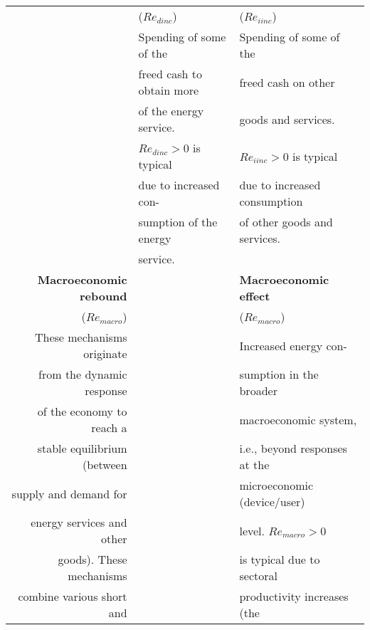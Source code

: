 \begin{table}
\begin{center}
\begin{tabular}{ r l l }
                                   & ($Re_{dinc}$)                                & ($Re_{iinc}$)   \\
                                   & Spending of some of the                      & Spending of some of the    \\
                                   & freed cash to obtain more                    & freed cash on other     \\ 
                                   & of the energy service.                       & goods and services.   \\
                                   & $Re_{dinc} > 0$ is typical                   & $Re_{iinc} > 0$ is typical  \\
                                   & due to increased con-                        & due to increased consumption   \\
                                   & sumption of the energy                       & of other goods and services. \\
                                   & service.                                     & \\
\midrule
\textbf{Macroeconomic rebound}     &                                              & \textbf{Macroeconomic effect}  \\
\multicolumn{1}{r}{($Re_{macro}$)} &                                              & ($Re_{macro}$)  \\
These mechanisms originate         &                                              & Increased energy con- \\
from the dynamic response          &                                              & sumption in the broader    \\
of the economy to reach a          &                                              & macroeconomic system,  \\
stable equilibrium (between        &                                              & i.e., beyond responses at the    \\
supply and demand for              &                                              & microeconomic (device/user)  \\
energy services and other          &                                              & level. $Re_{macro} > 0$  \\
goods). These mechanisms           &                                              & is typical due to sectoral \\\
combine various short and          &                                              & productivity increases (the \\

\end{tabular}
\end{center}
\end{table}
